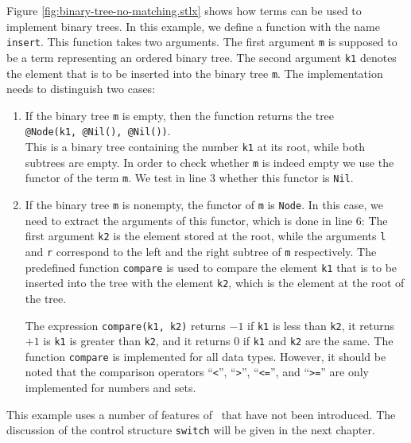 Figure \ref{fig:binary-tree-no-matching.stlx} shows how terms can be used to implement
binary trees.  In this example, we define a function with the name \texttt{insert}.  This function
takes two arguments.  The first argument \texttt{m} is supposed to be a term representing an ordered binary
tree.  The second argument \texttt{k1} denotes the element that is to be inserted into the binary
tree \texttt{m}.   The implementation needs to distinguish two cases:
\begin{enumerate}
\item If the binary tree \texttt{m} is empty, then the function returns the tree
      \\[0.2cm]
      \hspace*{1.3cm}
      \texttt{@Node(k1, @Nil(), @Nil())}.
      \\[0.2cm]
      This is a binary tree containing the number \texttt{k1} at its root, while both subtrees are
      empty.  In order to check whether \texttt{m} is indeed empty we use the functor of the term
      \texttt{m}.  We test in line  3 whether this functor is \texttt{Nil}.
\item If the binary tree \texttt{m} is nonempty, the functor of \texttt{m} is
      \texttt{Node}.  In this case, we need to extract the arguments of this
      functor, which is done in line 6: The first argument \texttt{k2} is the element stored at the
      root, while the arguments \texttt{l} and \texttt{r} correspond to the left and the right
      subtree of \texttt{m} respectively.  The predefined function \texttt{compare} is used to
      compare the element \texttt{k1} that is to be inserted into the tree with the element
      \texttt{k2}, which is the element at the root of the tree.

      The expression \texttt{compare(k1, k2)} returns $-1$ if \texttt{k1} is less than
      \texttt{k2}, it returns $+1$ is \texttt{k1} is greater than \texttt{k2}, and it returns $0$
      if \texttt{k1} and \texttt{k2} are the same.  The function \texttt{compare} is implemented for
      all data types.  However, it should be noted that the comparison operators ``\texttt{<}'', ``\texttt{>}'',
      ``\texttt{<=}'', and ``\texttt{>=}'' are only implemented for numbers and sets.
\end{enumerate}
This example uses a number of features of \setlx\ that have not been introduced. The discussion of
the control structure \texttt{switch} will be given in the next chapter.

